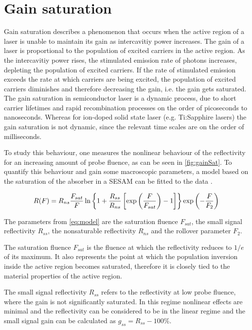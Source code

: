 \section{Gain saturation}

Gain saturation describes a phenomenon that occurs when the active region of a laser is unable to maintain its gain as intercavitiy power increases. The gain of a laser is proportional to the population of excited carriers in the active region. As the intercavitiy power rises, the stimulated emission rate of photons increases, depleting the population of excited carriers. If the rate of stimulated emission exceeds the rate at which carriers are being excited, the population of excited carriers diminishes and therefore decreasing the gain, i.e. the gain gets saturated. The gain saturation in semiconductor laser is a dynamic process, due to short carrier lifetimes and rapid recombination processes on the order of picoseconds to nanoseconds. Whereas for ion-doped solid state laser (e.g. Ti:Sapphire lasers) the gain saturation is not dynamic, since the relevant time scales are on the order of milliseconds.

To study this behaviour, one measures the nonlinear behaviour of the reflectivity for an increasing amount of probe fluence, as can be seen in \cref{fig:gainSat}. To quantify this behaviour and gain some macroscopic parameters, a model based on the saturation of the absorber in a SESAM can be fitted to the data \cite{Haiml2004OpticalAbsorbers}. 

\begin{equation}
    \centering
    R(F)=R_{ns} \frac{F_{sat}}{F} \ln\left\{1 + \frac{R_{ss}}{R_{ns}} \left[\exp{ \left(\frac{F}{F_{sat}}\right) } - 1\right]\right\} \exp{\left(-\frac{F}{F_2}\right)}
    \label{eq:model}
\end{equation}

The parameters from \cref{eq:model} are the saturation fluence $F_{sat}$, the small signal reflectivity $R_{ss}$, the nonsaturable reflectivity $R_{ns}$ and the rollover parameter $F_{2}$.

The saturation fluence $F_{sat}$ is the fluence at which the reflectivity reduces to $1/e$ of its maximum. It also represents the point at which the population inversion inside the active region becomes saturated, therefore it is closely tied to the material properties of the active region.

The small signal reflectivity $R_{ss}$ refers to the reflectivity at low probe fluence, where the gain is not significantly saturated. In this regime nonlinear effects are minimal and the reflectivity can be considered to be in the linear regime and the small signal gain can be calculated as $g_{ss}=R_{ss}-100\%$.

